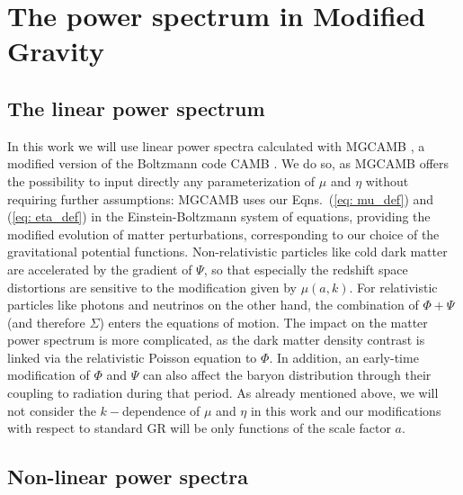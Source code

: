 \section{\label{sec:The-non-linear-power}The power spectrum in Modified
Gravity}


\subsection{The linear power spectrum}

In this work we will use linear power spectra calculated with MGCAMB
\cite{zhao_searching_2009,hojjati_testing_2011}, a modified version
of the Boltzmann code CAMB \cite{lewis_efficient_2000}. We do so,
as MGCAMB offers the possibility to input directly any parameterization
of $\mu$ and $\eta$ without requiring further assumptions:
MGCAMB uses our Eqns.\ (\ref{eq: mu_def}) and (\ref{eq: eta_def}) in the Einstein-Boltzmann
system of equations, providing the modified evolution of matter perturbations,
corresponding to our choice of the gravitational potential functions.
Non-relativistic particles like cold dark matter are accelerated by the
gradient of $\Psi$, so that especially the redshift space distortions are
sensitive to the modification given by $\mu(a,k)$. For relativistic particles
like photons and neutrinos on the other hand, the combination of $\Phi+\Psi$ (and therefore $\Sigma$)
enters the equations of motion. The impact on the matter power spectrum
is more complicated, as the dark matter density contrast is linked via
the relativistic Poisson equation to $\Phi$. In addition, an early-time
modification of $\Phi$ and $\Psi$ can also affect the baryon distribution through
their coupling to radiation during that period.
As already mentioned above, we will not consider
the $k-$dependence of $\mu$ and $\eta$ in this work and our modifications
with respect to standard GR will be only functions of the scale factor
$a$.


\subsection{Non-linear power spectra}

